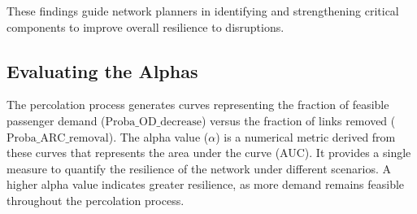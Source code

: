 \documentclass[
  letterpaper,
  DIV=11,
  numbers=noendperiod]{scrartcl}
\begin{document}
These findings guide network planners in identifying and strengthening
critical components to improve overall resilience to disruptions.

\subsection{Evaluating the Alphas}\label{evaluating-the-alphas}

The percolation process generates curves representing the fraction of
feasible passenger demand (\(\text{Proba\_OD\_decrease}\)) versus the
fraction of links removed (\(\text{Proba\_ARC\_removal}\)). The alpha
value (\(\alpha\)) is a numerical metric derived from these curves that
represents the area under the curve (AUC). It provides a single measure
to quantify the resilience of the network under different scenarios. A
higher alpha value indicates greater resilience, as more demand remains
feasible throughout the percolation process.
\end{document}
